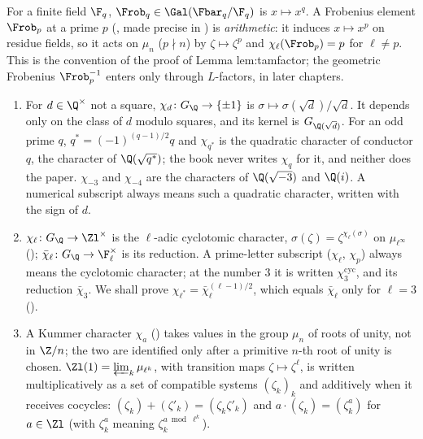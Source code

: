 \begin{convention}\label{conv:galois:frobenius}
For a finite field $\F_q$, $\Frob_q\in\Gal(\Fbar_q/\F_q)$ is $x\mapsto x^q$. A Frobenius element $\Frob_p$ at a prime $p$ (, made
precise in ) is \emph{arithmetic}: it induces $x\mapsto x^p$ on residue fields, so it acts on $\mu_n$ ($p\nmid n$) by $\zeta\mapsto\zeta^p$
and $\chi_\ell(\Frob_p)=p$ for $\ell\ne p$. This is the convention of the proof of Lemma lem:tamfactor; the geometric Frobenius $\Frob_p^{-1}$ enters only
through $L$-factors, in later chapters.
\end{convention}

\begin{convention}[Characters]\label{conv:galois:characters}
\begin{enumerate}[label=(\alph*)]
\item For $d\in\Q^\times$ not a square, $\chi_d\colon G_\Q\to\{\pm1\}$ is $\sigma\mapsto\sigma(\sqrt d)/\sqrt d$. It depends only on the class of $d$
modulo squares, and its kernel is $G_{\Q(\sqrt d)}$. For an odd prime $q$, $q^*=(-1)^{(q-1)/2}q$ and $\chi_{q^*}$ is the quadratic character of conductor $q$,
the character of $\Q(\sqrt{q^*})$; the book never writes $\chi_q$ for it, and neither does the paper. $\chi_{-3}$ and $\chi_{-4}$ are the
characters of $\Q(\sqrt{-3})$ and $\Q(i)$. A numerical subscript always means such a quadratic character, written with the sign of $d$.
\item $\chi_\ell\colon G_\Q\to\Zl^\times$ is the $\ell$-adic cyclotomic character, $\sigma(\zeta)=\zeta^{\chi_\ell(\sigma)}$ on $\mu_{\ell^\infty}$
(); $\bar\chi_\ell\colon G_\Q\to\F_\ell^\times$ is its reduction. A prime-letter subscript ($\chi_\ell$, $\chi_p$) always
means the cyclotomic character; at the number $3$ it is written $\chi_3^{\mathrm{cyc}}$, and its reduction $\bar\chi_3$. We shall prove
$\chi_{\ell^*}=\bar\chi_\ell^{(\ell-1)/2}$, which equals $\bar\chi_\ell$ only for $\ell=3$ ().
\item A Kummer character $\chi_a$ () takes values in the group $\mu_n$ of roots of unity, not in $\Z/n$; the two are
identified only after a primitive $n$-th root of unity is chosen. $\Zl(1)=\varprojlim_k\mu_{\ell^k}$, with transition maps $\zeta\mapsto\zeta^\ell$, is
written multiplicatively as a set of compatible systems $(\zeta_k)_k$ and additively when it receives cocycles: $(\zeta_k)+(\zeta'_k)=(\zeta_k\zeta'_k)$ and
$a\cdot(\zeta_k)=(\zeta_k^{a})$ for $a\in\Zl$ (with $\zeta_k^a$ meaning $\zeta_k^{a\bmod\ell^k}$).
\end{enumerate}
\end{convention}

